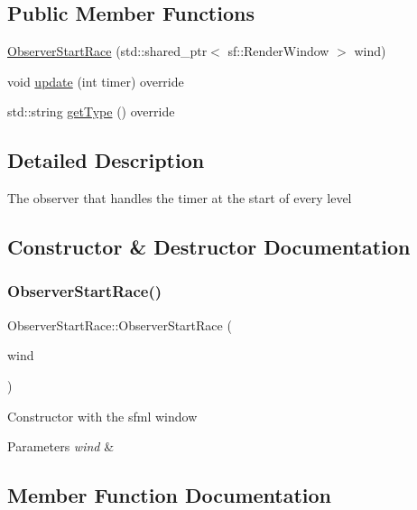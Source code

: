 \subsection*{Public Member Functions}
\begin{DoxyCompactItemize}
\item 
\hyperlink{classObserverStartRace_a663caac255a23d662e1d3631b3ed12a9}{Observer\+Start\+Race} (std\+::shared\+\_\+ptr$<$ sf\+::\+Render\+Window $>$ wind)
\item 
void \hyperlink{classObserverStartRace_aa810164d0877c5597ec06adab29b7981}{update} (int timer) override
\item 
std\+::string \hyperlink{classObserverStartRace_af664693404c9c8f756a8e4ba7d687c3a}{get\+Type} () override
\end{DoxyCompactItemize}


\subsection{Detailed Description}
The observer that handles the timer at the start of every level 

\subsection{Constructor \& Destructor Documentation}
\mbox{\label{classObserverStartRace_a663caac255a23d662e1d3631b3ed12a9}} 
\subsubsection{\texorpdfstring{Observer\+Start\+Race()}{ObserverStartRace()}}
{\footnotesize\ttfamily Observer\+Start\+Race\+::\+Observer\+Start\+Race (\begin{DoxyParamCaption}\item[{std\+::shared\+\_\+ptr$<$ sf\+::\+Render\+Window $>$}]{wind }\end{DoxyParamCaption})}

Constructor with the sfml window 
\begin{DoxyParams}{Parameters}
{\em wind} & \\
\hline
\end{DoxyParams}


\subsection{Member Function Documentation}
\mbox{\label{classObserverStartRace_af664693404c9c8f756a8e4ba7d687c3a}} 
